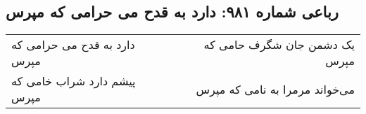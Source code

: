 \begin{center}
\section*{رباعی شماره ۹۸۱: دارد به قدح می حرامی که مپرس}
\label{sec:0981}
\begin{longtable}{l p{0.5cm} r}
دارد به قدح می حرامی که مپرس
&&
یک دشمن جان شگرف حامی که مپرس
\\
پیشم دارد شراب خامی که مپرس
&&
می‌خواند مرمرا به نامی که مپرس
\\
\end{longtable}
\end{center}
